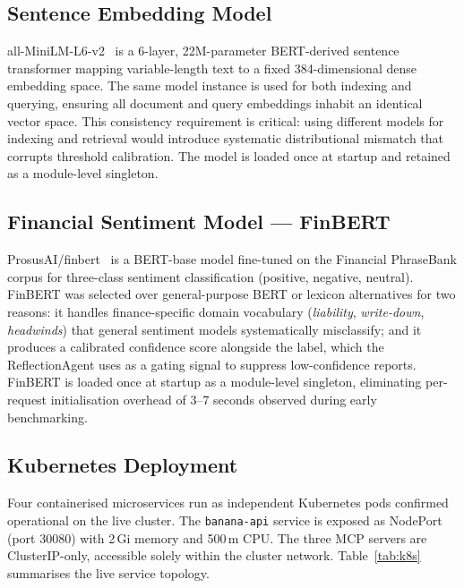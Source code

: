 \documentclass[10pt,twocolumn]{article}
\newcommand{\node}[1]{\texttt{#1}}
\begin{document}
\subsection{Sentence Embedding Model}

all-MiniLM-L6-v2~\cite{wang2020minilm} is a 6-layer, 22M-parameter
BERT-derived sentence transformer mapping variable-length text to a
fixed 384-dimensional dense embedding space.
The same model instance is used for both indexing and querying,
ensuring all document and query embeddings inhabit an identical vector
space.
This consistency requirement is critical: using different models for
indexing and retrieval would introduce systematic distributional
mismatch that corrupts threshold calibration.
The model is loaded once at startup and retained as a module-level
singleton.

\subsection{Financial Sentiment Model --- FinBERT}

ProsusAI/finbert~\cite{yang2020finbert} is a BERT-base model
fine-tuned on the Financial PhraseBank corpus for three-class
sentiment classification (positive, negative, neutral).
FinBERT was selected over general-purpose BERT or lexicon alternatives
for two reasons: it handles finance-specific domain vocabulary
(\emph{liability}, \emph{write-down}, \emph{headwinds}) that general
sentiment models systematically misclassify; and it produces a
calibrated confidence score alongside the label, which the
ReflectionAgent uses as a gating signal to suppress low-confidence
reports.
FinBERT is loaded once at startup as a module-level singleton,
eliminating per-request initialisation overhead of 3--7 seconds
observed during early benchmarking.

\subsection{Kubernetes Deployment}

Four containerised microservices run as independent Kubernetes pods
confirmed operational on the live cluster.
The \node{banana-api} service is exposed as NodePort (port 30080)
with 2\,Gi memory and 500\,m CPU.
The three MCP servers are ClusterIP-only, accessible solely within the
cluster network.
Table~\ref{tab:k8s} summarises the live service topology.
\end{document}
